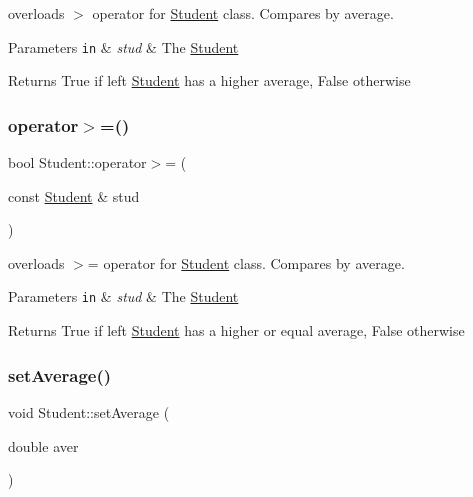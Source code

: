 overloads $>$ operator for \mbox{\hyperlink{class_student}{Student}} class. Compares by average. 


\begin{DoxyParams}[1]{Parameters}
\mbox{\tt in}  & {\em stud} & The \mbox{\hyperlink{class_student}{Student}}\\
\hline
\end{DoxyParams}
\begin{DoxyReturn}{Returns}
True if left \mbox{\hyperlink{class_student}{Student}} has a higher average, False otherwise 
\end{DoxyReturn}
\mbox{\label{class_student_a39be9cda43dd5af76987a77ab33b21e3}} 
\subsubsection{\texorpdfstring{operator$>$=()}{operator>=()}}
{\footnotesize\ttfamily bool Student\+::operator$>$= (\begin{DoxyParamCaption}\item[{const \mbox{\hyperlink{class_student}{Student}} \&}]{stud }\end{DoxyParamCaption})\hspace{0.3cm}{\ttfamily [inline]}}



overloads $>$= operator for \mbox{\hyperlink{class_student}{Student}} class. Compares by average. 


\begin{DoxyParams}[1]{Parameters}
\mbox{\tt in}  & {\em stud} & The \mbox{\hyperlink{class_student}{Student}}\\
\hline
\end{DoxyParams}
\begin{DoxyReturn}{Returns}
True if left \mbox{\hyperlink{class_student}{Student}} has a higher or equal average, False otherwise 
\end{DoxyReturn}
\mbox{\label{class_student_a70e7e26775d28c57a44eb30444ebe6cf}} 
\subsubsection{\texorpdfstring{set\+Average()}{setAverage()}}
{\footnotesize\ttfamily void Student\+::set\+Average (\begin{DoxyParamCaption}\item[{double}]{aver }\end{DoxyParamCaption})\hspace{0.3cm}{\ttfamily [inline]}}



